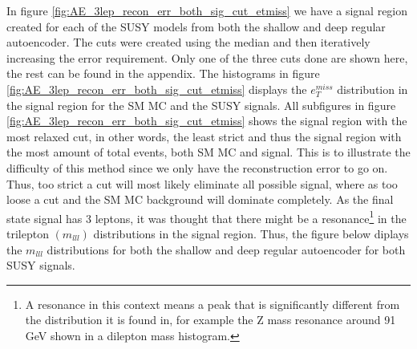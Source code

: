 In figure \ref{fig:AE_3lep_recon_err_both_sig_cut_etmiss} we have a signal region created 
for each of the SUSY models from both the shallow and deep regular autoencoder. The cuts 
were created using the median and then iteratively increasing the error requirement.
Only one of the three cuts done are shown here, the rest can be found in the appendix. 
The histograms in figure \ref{fig:AE_3lep_recon_err_both_sig_cut_etmiss} displays the 
$e_T^{miss}$ distribution in the signal region for the SM MC and the SUSY signals. All 
subfigures in figure \ref{fig:AE_3lep_recon_err_both_sig_cut_etmiss} shows the signal region 
with the most relaxed cut, in other words, the least strict and thus the signal region 
with the most amount of total events, both SM MC and signal. This is to illustrate the difficulty
of this method since we only have the reconstruction error to go on. Thus, too strict a cut 
will most likely eliminate all possible signal, where as too loose a cut and the SM MC background 
will dominate completely. As the final state signal has 3 leptons, it was thought that 
there might be a resonance\footnote{A resonance in this context means a peak that is significantly 
different from the distribution it is found in, for example the Z mass resonance around 91 GeV shown in a dilepton mass histogram. } in the trilepton $(m_{lll})$ distributions in the signal region. 
Thus, the figure below diplays the $m_{lll}$ distributions for both the shallow and deep 
regular autoencoder for both SUSY signals. 


